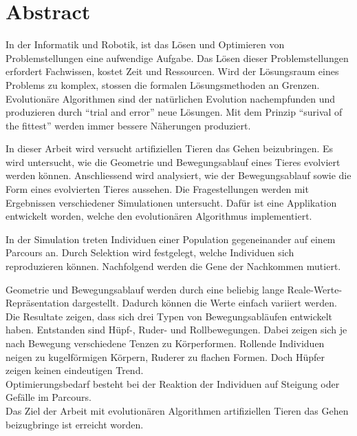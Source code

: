 %
%


\chapter{Abstract}

  In der Informatik und Robotik, ist das Lösen und Optimieren von Problemstellungen eine aufwendige Aufgabe.
  Das Lösen dieser Problemstellungen erfordert Fachwissen, kostet Zeit und Ressourcen.
  Wird der Lösungsraum eines Problems zu komplex, stossen die formalen Lösungsmethoden an Grenzen.
  Evolutionäre Algorithmen sind der natürlichen Evolution nachempfunden und
  produzieren durch ``trial and error'' neue Lösungen.
  Mit dem Prinzip ``surival of the fittest'' werden immer bessere Näherungen produziert.

  \smallskip

  In dieser Arbeit wird versucht artifiziellen Tieren das Gehen beizubringen.
  Es wird untersucht, wie die Geometrie und Bewegungsablauf eines Tieres evolviert werden können.
  Anschliessend wird analysiert, wie der Bewegungsablauf sowie die Form eines evolvierten Tieres aussehen.
  Die Fragestellungen werden mit Ergebnissen verschiedener Simulationen untersucht.
  Dafür ist eine Applikation entwickelt worden, welche den evolutionären Algorithmus implementiert.

  \smallskip

  In der Simulation treten Individuen einer Population gegeneinander auf einem Parcours an.
  Durch Selektion wird festgelegt, welche Individuen sich reproduzieren können.
  Nachfolgend werden die Gene der Nachkommen mutiert.

  \smallskip

  Geometrie und Bewegungsablauf werden durch eine beliebig lange Reale-Werte-Repräsentation dargestellt.
  Dadurch können die Werte einfach variiert werden.
  Die Resultate zeigen, dass sich drei Typen von Bewegungsabläufen entwickelt haben.
  Entstanden sind Hüpf-, Ruder- und Rollbewegungen.
  Dabei zeigen sich je nach Bewegung verschiedene Tenzen zu Körperformen.
  Rollende Individuen neigen zu kugelförmigen Körpern, Ruderer zu flachen Formen.
  Doch Hüpfer zeigen keinen eindeutigen Trend.
  \\
  Optimierungsbedarf besteht bei der Reaktion der Individuen auf Steigung oder Gefälle im Parcours.
  \\
  Das Ziel der Arbeit mit evolutionären Algorithmen artifiziellen Tieren das Gehen beizugbringe ist erreicht worden.
